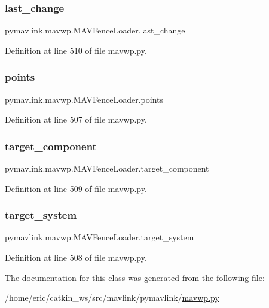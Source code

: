 \subsubsection{\texorpdfstring{last\_change}{last\_change}}
{\footnotesize\ttfamily pymavlink.\+mavwp.\+M\+A\+V\+Fence\+Loader.\+last\+\_\+change}



Definition at line 510 of file mavwp.\+py.

\mbox{\label{classpymavlink_1_1mavwp_1_1MAVFenceLoader_a280180d0d631199133ba120b55fc74ee}} 
\subsubsection{\texorpdfstring{points}{points}}
{\footnotesize\ttfamily pymavlink.\+mavwp.\+M\+A\+V\+Fence\+Loader.\+points}



Definition at line 507 of file mavwp.\+py.

\mbox{\label{classpymavlink_1_1mavwp_1_1MAVFenceLoader_a38751985c2a37046971dcd69a83b8370}} 
\subsubsection{\texorpdfstring{target\_component}{target\_component}}
{\footnotesize\ttfamily pymavlink.\+mavwp.\+M\+A\+V\+Fence\+Loader.\+target\+\_\+component}



Definition at line 509 of file mavwp.\+py.

\mbox{\label{classpymavlink_1_1mavwp_1_1MAVFenceLoader_ad95b9bdad05fdf89e63f52ffd2c8aa87}} 
\subsubsection{\texorpdfstring{target\_system}{target\_system}}
{\footnotesize\ttfamily pymavlink.\+mavwp.\+M\+A\+V\+Fence\+Loader.\+target\+\_\+system}



Definition at line 508 of file mavwp.\+py.



The documentation for this class was generated from the following file\+:\begin{DoxyCompactItemize}
\item 
/home/eric/catkin\+\_\+ws/src/mavlink/pymavlink/\mbox{\hyperlink{mavwp_8py}{mavwp.\+py}}\end{DoxyCompactItemize}
